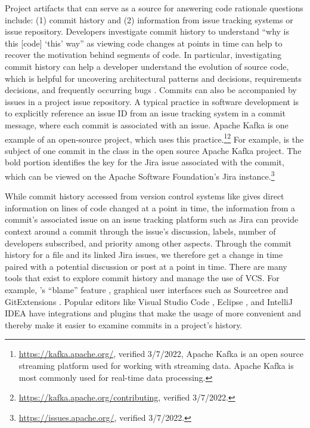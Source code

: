 Project artifacts that can serve as a source for answering code rationale questions include: (1) commit history and (2) information from issue tracking systems or issue repository. 
Developers investigate commit history to understand ``why is this [code] ‘this’ way'' as viewing code changes at points in time can help to recover the motivation behind segments of code.
In particular, investigating commit history can help a developer understand the evolution of source code, which is helpful for uncovering architectural patterns and decisions, requirements decisions, and frequently occurring bugs \cite{codoban_software_2015}.
Commits can also be accompanied by issues in a project issue repository. 
A typical practice in software development is to explicitly reference an issue ID from an issue tracking system in a commit message, where each commit is associated with an issue. Apache Kafka is one example of an open-source project, which uses this practice.\footnote{\url{https://kafka.apache.org/}, verified 3/7/2022, Apache Kafka is an open source streaming platform used for working with streaming data. Apache Kafka is most commonly used for real-time data processing.}\footnote{\url{https://kafka.apache.org/contributing}, verified 3/7/2022.}
For example, \colorbox{lightgray}{} is the subject of one commit in the  class in the open source Apache Kafka project. The bold portion identifies the key for the Jira issue associated with the commit, which can be viewed on the Apache Software Foundation's Jira instance.\footnote{\url{https://issues.apache.org/}, verified 3/7/2022.}

While commit history accessed from version control systems like  gives direct information on lines of code changed at a point in time, the information from a commit's associated issue on an issue tracking platform such as Jira \cite{jira} can provide context around a commit through the issue's discussion, labels, number of developers subscribed, and priority among other aspects.
Through the commit history for a file and its linked Jira issues, we therefore get a change in time paired with a potential discussion or post at a point in time.
There are many tools that exist to explore commit history and manage the use of VCS. For example, 's ``blame'' feature \cite{gitblame}, graphical user interfaces such as Sourcetree \cite{sourcetree} and GitExtensions \cite{gitextensions}. 
Popular editors like Visual Studio Code \cite{vscode}, Eclipse \cite{eclipse}, and IntelliJ IDEA \cite{intellij} have  integrations and plugins that make the usage of  more convenient and thereby make it easier to examine commits in a project's history. 

